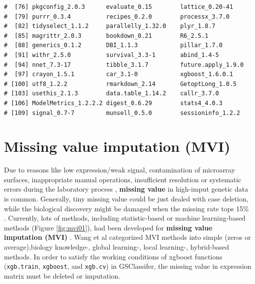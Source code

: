 \documentclass[
  12pt,
]{book}
\begin{document}
\begin{verbatim}
#  [76] pkgconfig_2.0.3      evaluate_0.15        lattice_0.20-41     
#  [79] purrr_0.3.4          recipes_0.2.0        processx_3.7.0      
#  [82] tidyselect_1.1.2     parallelly_1.32.0    plyr_1.8.7          
#  [85] magrittr_2.0.3       bookdown_0.21        R6_2.5.1            
#  [88] generics_0.1.2       DBI_1.1.3            pillar_1.7.0        
#  [91] withr_2.5.0          survival_3.3-1       abind_1.4-5         
#  [94] nnet_7.3-17          tibble_3.1.7         future.apply_1.9.0  
#  [97] crayon_1.5.1         car_3.1-0            xgboost_1.6.0.1     
# [100] utf8_1.2.2           rmarkdown_2.14       GetoptLong_1.0.5    
# [103] usethis_2.1.3        data.table_1.14.2    callr_3.7.0         
# [106] ModelMetrics_1.2.2.2 digest_0.6.29        stats4_4.0.3        
# [109] signal_0.7-7         munsell_0.5.0        sessioninfo_1.2.2
\end{verbatim}

\hypertarget{missing-value-imputation-mvi}{%
\section{Missing value imputation (MVI)}\label{missing-value-imputation-mvi}}

Due to reasons like low expression/weak signal, contamination of microarray surfaces, inappropriate manual operations, insufficient resolution or systematic errors during the laboratory process \citep{RN387, RN389, RN382}, \textbf{missing value} in high-imput genetic data is common. Generally, tiny missing value could be just dealed with case deletion, while the biological discovery might be damaged when the missing rate tops 15\% \citep{RN392, RN386}. Currently, lots of methods, including statistic-based or machine learning-based methods (Figure \ref{fig:mvi01}), had been developed for \textbf{missing value imputation (MVI)} \citep{RN386}. Wang et al \citep{RN384} categorized MVI methods into simple (zeros or average),biology knowledge-, global learning-, local learning-, hybrid-based methods. In order to satisfy the working conditions of xgboost \citep{xgboost} functions (\texttt{xgb.train}, \texttt{xgboost}, and \texttt{xgb.cv}) in GSClassifer, the missing value in expression matrix must be deleted or imputation.
\end{document}
